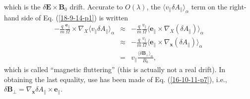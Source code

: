 \documentclass{article}
\begin{document}
which is the $\delta \mathbf{E} \times \mathbf{B}_0$ drift. Accurate to $O
(\lambda)$, the $\langle v_{\parallel} \delta A_{\parallel} \rangle_{\alpha}$
term on the right-hand side of Eq. (\ref{18-9-14-p1}) is written
\begin{eqnarray}
  - \frac{q}{m}  \frac{\mathbf{e}_{\parallel}}{\Omega} \times \nabla_X \langle
  v_{\parallel} \delta A_{\parallel} \rangle_{\alpha} & \approx & -
  \frac{q}{m}  \frac{v_{\parallel}}{\Omega} \langle \mathbf{e}_{\parallel}
  \times \nabla_X (\delta A_{\parallel}) \rangle_{\alpha} \nonumber\\
  & \approx & - \frac{q}{m} \frac{v_{\parallel}}{\Omega} \langle
  \mathbf{e}_{\parallel} \times \nabla_{\mathbf{x}} (\delta A_{\parallel})
  \rangle_{\alpha} \\
  & = & v_{\parallel} \frac{\langle \delta \mathbf{B}_{\perp}
  \rangle_{\alpha}}{B_0},  \label{16-10-11-p10}
\end{eqnarray}
which is called ``magnetic fluttering'' (this is actually not a real drift).
In obtaining the last equality, use has been made of Eq. (\ref{16-10-11-p7}),
i.e., $\delta \mathbf{B}_{\perp} = \nabla_{\mathbf{x}} \delta A_{\parallel}
\times \mathbf{e}_{\parallel}$.
\end{document}
